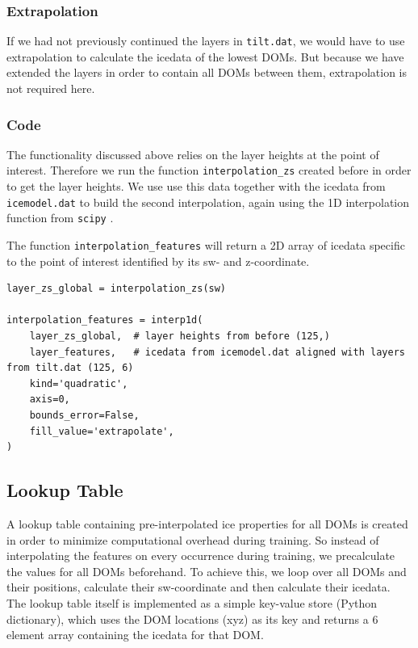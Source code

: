 \documentclass[a4paper,10pt]{scrartcl}
\begin{document}
\subsubsection*{Extrapolation}

If we had not previously continued the layers in \texttt{tilt.dat}, we would have to use extrapolation to calculate the icedata of the lowest DOMs.
But because we have extended the layers in order to contain all DOMs between them, extrapolation is not required here.

\subsubsection*{Code}

The functionality discussed above relies on the layer heights at the point of interest.
Therefore we run the function \texttt{interpolation\_zs} created before in order to get the layer heights.
We use use this data together with the icedata from \texttt{icemodel.dat} to build the second interpolation, again using the 1D interpolation function from \texttt{scipy} \cite{scipy}.

The function \texttt{interpolation\_features} will return a 2D array of icedata specific to the point of interest identified by its sw- and z-coordinate.

\begin{verbatim}
layer_zs_global = interpolation_zs(sw)

interpolation_features = interp1d(
    layer_zs_global,  # layer heights from before (125,)
    layer_features,   # icedata from icemodel.dat aligned with layers from tilt.dat (125, 6)
    kind='quadratic',
    axis=0,
    bounds_error=False,
    fill_value='extrapolate',
)
\end{verbatim}

\subsection{Lookup Table}

A lookup table containing pre-interpolated ice properties for all DOMs is created in order to minimize computational overhead during training.
So instead of interpolating the features on every occurrence during training, we precalculate the values for all DOMs beforehand.
To achieve this, we loop over all DOMs and their positions, calculate their sw-coordinate and then calculate their icedata.
The lookup table itself is implemented as a simple key-value store (Python dictionary), which uses the DOM locations (xyz) as its key and returns a 6 element array containing the icedata for that DOM.
\end{document}
